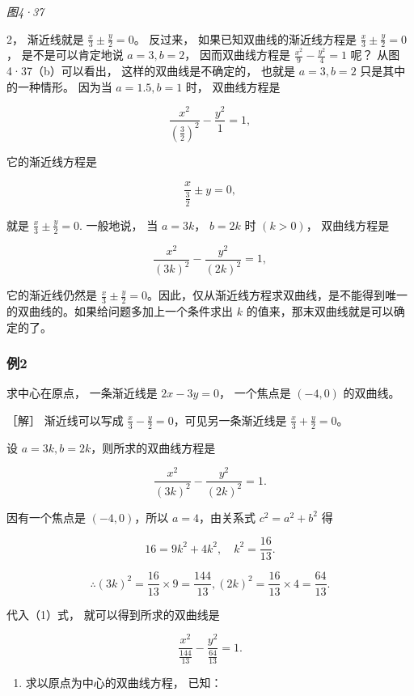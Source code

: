 \emph{图4·37}

2， 渐近线就是 \(\frac{x}{3} \pm \frac{y}{2} = 0\)。 反过来，
如果已知双曲线的渐近线方程是 \(\frac{x}{3} \pm \frac{y}{2} = 0\)，
是不是可以肯定地说 \(a = 3, b = 2\)， 因而双曲线方程是
\(\frac{x^2}{9} - \frac{y^2}{4} = 1\) 呢？ 从图4·37（b）可以看出，
这样的双曲线是不确定的， 也就是 \(a = 3, b = 2\) 只是其中的一种情形。
因为当 \(a = 1.5, b = 1\) 时， 双曲线方程是

\[
\frac {x^{2}}{\left(\frac {3}{2}\right) ^ {2}} - \frac {y^{2}}{1} = 1,
\]

它的渐近线方程是

\[
\frac {x}{\frac {3}{2}} \pm y = 0,
\]

就是 \(\frac{x}{3} \pm \frac{y}{2} = 0.\) 一般地说， 当 \(a = 3k\)，
\(b = 2k\) 时 \((k > 0)\)， 双曲线方程是

\[
\frac {x^{2}}{(3 k) ^ {2}} - \frac {y^{2}}{(2 k) ^ {2}} = 1,
\]

它的渐近线仍然是
\(\frac{x}{3} \pm \frac{y}{2} = 0\)。因此，仅从渐近线方程求双曲线，是不能得到唯一的双曲线的。如果给问题多加上一个条件求出
\(k\) 的值来，那末双曲线就是可以确定的了。

\subsubsection{例2}\label{ux4f8b2-24}

求中心在原点， 一条渐近线是 \(2x - 3y = 0\)， 一个焦点是 \((-4, 0)\)
的双曲线。

［解］ 渐近线可以写成
\(\frac{x}{3} - \frac{y}{2} = 0\)，可见另一条渐近线是
\(\frac{x}{3} + \frac{y}{2} = 0\)。

设 \(a = 3k, b = 2k\)，则所求的双曲线方程是

\[
\frac {x^{2}}{(3 k) ^ {2}} - \frac {y^{2}}{(2 k) ^ {2}} = 1. \tag {1}
\]

因有一个焦点是 \((-4,0)\)，所以 \(a = 4\)，由关系式 \(c^2 = a^2 + b^2\)
得

\[
16 = 9 k^{2} + 4 k^{2}, \quad k^{2} = \frac {16}{13}.
\]

\[
\therefore (3 k) ^ {2} = \frac {16}{13} \times 9 = \frac {144}{13}, (2 k) ^ {2} = \frac {16}{13} \times 4 = \frac {64}{13}.
\]

代入（1）式， 就可以得到所求的双曲线是

\[
\frac {x^{2}}{\frac {144}{13}} - \frac {y^{2}}{\frac {64}{13}} = 1.
\]

\begin{enumerate}
\def\labelenumi{\arabic{enumi}.}
\tightlist
\item
  求以原点为中心的双曲线方程， 已知：
\end{enumerate}

